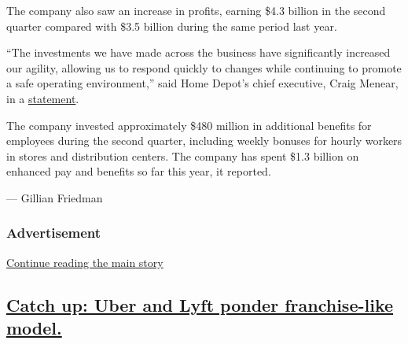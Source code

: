 The company also saw an increase in profits, earning \$4.3 billion in
the second quarter compared with \$3.5 billion during the same period
last year.

``The investments we have made across the business have significantly
increased our agility, allowing us to respond quickly to changes while
continuing to promote a safe operating environment,'' said Home Depot's
chief executive, Craig Menear, in a
\href{https://corporate.homedepot.com/newsroom/news-release-home-depot-announces-second-quarter-2020-results}{statement}.

The company invested approximately \$480 million in additional benefits
for employees during the second quarter, including weekly bonuses for
hourly workers in stores and distribution centers. The company has spent
\$1.3 billion on enhanced pay and benefits so far this year, it
reported.

--- Gillian Friedman

\hypertarget{advertisement-1}{%
\subsubsection{Advertisement}\label{advertisement-1}}

\protect\hyperlink{after-dfp-ad-mid2}{Continue reading the main story}

\hypertarget{catch-up-uber-and-lyft-ponder-franchise-like-model}{%
\subsection{\texorpdfstring{\protect\hyperlink{catch-up-uber-and-lyft-ponder-franchise-like-model}{Catch
up: Uber and Lyft ponder franchise-like
model.}}{Catch up: Uber and Lyft ponder franchise-like model.}}\label{catch-up-uber-and-lyft-ponder-franchise-like-model}}


